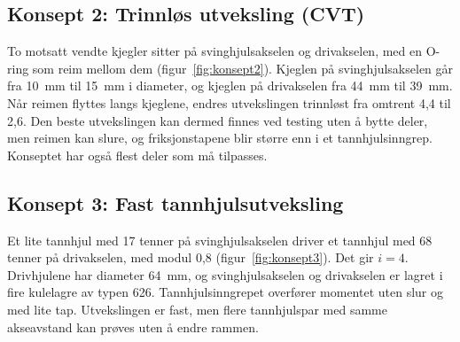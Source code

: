 \subsection{Konsept 2: Trinnløs utveksling (CVT)}
To motsatt vendte kjegler sitter på svinghjulsakselen og drivakselen, med en O-ring som reim mellom dem (figur~\ref{fig:konsept2}). Kjeglen på svinghjulsakselen går fra \SI{10}{mm} til \SI{15}{mm} i diameter, og kjeglen på drivakselen fra \SI{44}{mm} til \SI{39}{mm}. Når reimen flyttes langs kjeglene, endres utvekslingen trinnløst fra omtrent 4,4 til 2,6. Den beste utvekslingen kan dermed finnes ved testing uten å bytte deler, men reimen kan slure, og friksjonstapene blir større enn i et tannhjulsinngrep. Konseptet har også flest deler som må tilpasses.

\subsection{Konsept 3: Fast tannhjulsutveksling}
Et lite tannhjul med 17 tenner på svinghjulsakselen driver et tannhjul med 68 tenner på drivakselen, med modul 0,8 (figur~\ref{fig:konsept3}). Det gir $i = 4$. Drivhjulene har diameter \SI{64}{mm}, og svinghjulsakselen og drivakselen er lagret i fire kulelagre av typen 626. Tannhjulsinngrepet overfører momentet uten slur og med lite tap. Utvekslingen er fast, men flere tannhjulspar med samme akseavstand kan prøves uten å endre rammen.

